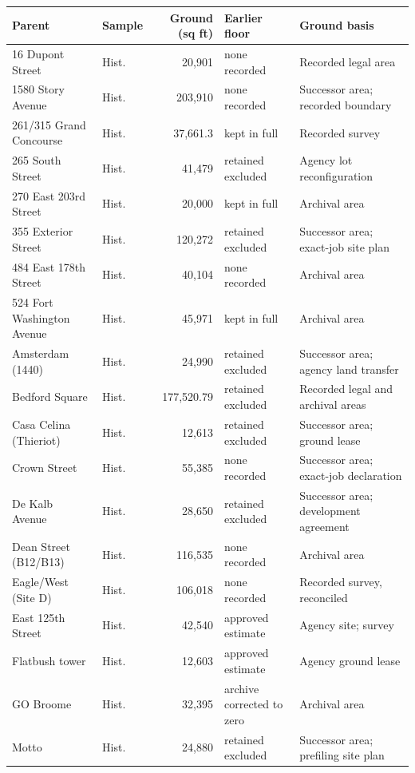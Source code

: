 \begin{center}
\footnotesize
\begin{tabular}{llrll}
\hline
Parent & Sample & Ground (sq ft) & Earlier floor & Ground basis \\
\hline
16 Dupont Street & Hist. & 20,901 & none recorded & Recorded legal area \\
1580 Story Avenue & Hist. & 203,910 & none recorded & Successor area; recorded boundary \\
261/315 Grand Concourse & Hist. & 37,661.3 & kept in full & Recorded survey \\
265 South Street & Hist. & 41,479 & retained excluded & Agency lot reconfiguration \\
270 East 203rd Street & Hist. & 20,000 & kept in full & Archival area \\
355 Exterior Street & Hist. & 120,272 & retained excluded & Successor area; exact-job site plan \\
484 East 178th Street & Hist. & 40,104 & none recorded & Archival area \\
524 Fort Washington Avenue & Hist. & 45,971 & kept in full & Archival area \\
Amsterdam (1440) & Hist. & 24,990 & retained excluded & Successor area; agency land transfer \\
Bedford Square & Hist. & 177,520.79 & retained excluded & Recorded legal and archival areas \\
Casa Celina (Thieriot) & Hist. & 12,613 & retained excluded & Successor area; ground lease \\
Crown Street & Hist. & 55,385 & none recorded & Successor area; exact-job declaration \\
De Kalb Avenue & Hist. & 28,650 & retained excluded & Successor area; development agreement \\
Dean Street (B12/B13) & Hist. & 116,535 & none recorded & Archival area \\
Eagle/West (Site D) & Hist. & 106,018 & none recorded & Recorded survey, reconciled \\
East 125th Street & Hist. & 42,540 & approved estimate & Agency site; survey \\
Flatbush tower & Hist. & 12,603 & approved estimate & Agency ground lease \\
GO Broome & Hist. & 32,395 & archive corrected to zero & Archival area \\
Motto & Hist. & 24,880 & retained excluded & Successor area; prefiling site plan \\

\end{tabular}
\end{center}
